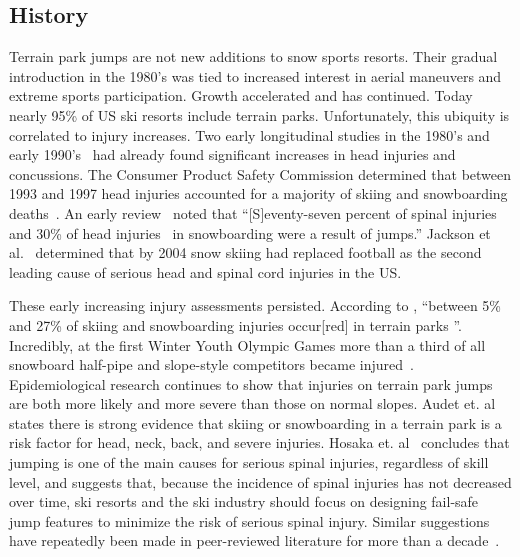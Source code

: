 \documentclass[smallextended]{svjour3}       %
\begin{document}
\subsection{History}
\label{sec:hist}
%
Terrain park jumps are not new additions to snow sports resorts. Their gradual
introduction in the 1980's was tied to increased interest in aerial maneuvers
and extreme sports participation. Growth accelerated and has continued. Today
nearly 95\% of US ski resorts include terrain parks. Unfortunately, this
ubiquity is correlated to injury increases. Two early longitudinal studies in
the 1980's and early 1990's~\cite{Deibert1998,Furrer1995} had already found
significant increases in head injuries and concussions. The Consumer Product
Safety Commission determined that between 1993 and 1997 head injuries accounted
for a majority of skiing and snowboarding deaths~\cite{CPSC1999}. An early
review~\cite{Koehle2002} noted that ``[S]eventy-seven percent of spinal
injuries~\cite{Tarazi1999} and 30\% of head injuries~\cite{Fukuda2001} in
snowboarding were a result of jumps.'' Jackson et al.~\cite{Jackson2004}
determined that by 2004 snow skiing had replaced football as the second leading
cause of serious head and spinal cord injuries in the US.

These early increasing injury assessments persisted. According to
\cite{Russell2014}, ``between 5\% and 27\% of skiing and snowboarding injuries
occur[red] in terrain parks
\cite{Bridges2003,Goulet2007,Moffat2009,Greve2009,Brooks2010,Ruedl2013}''.
Incredibly, at the first Winter Youth Olympic Games more than a third of all
snowboard half-pipe and slope-style competitors became
injured~\cite{Ruedl2012}. Epidemiological research continues to show
\cite{Carus2016,Audet2019a,Hosaka2020} that injuries on terrain park jumps are
both more likely and more severe than those on normal slopes. Audet et.
al~\cite{Audet2019a} states there is strong evidence that skiing or
snowboarding in a terrain park is a risk factor for head, neck, back, and
severe injuries. Hosaka et. al~\cite{Hosaka2020} concludes that jumping is one
of the main causes for serious spinal injuries, regardless of skill level, and
suggests that, because the incidence of spinal injuries has not decreased over
time, ski resorts and the ski industry should focus on designing fail-safe jump
features to minimize the risk of serious spinal injury. Similar suggestions
have repeatedly been made in peer-reviewed literature for more than a
decade~\cite{Hubbard2009,Swedberg2012,McNeil2012,McNeil2012a,Hubbard2015,Levy2015,Petrone2017,Moore2018}.
\end{document}
